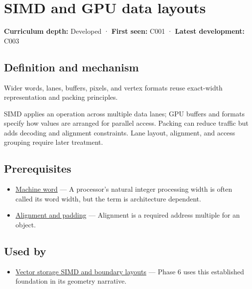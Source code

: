\hypertarget{appendix-3c7b1a56de01}{}\label{referencestart:appendix-3c7b1a56de01}
\section{SIMD and GPU data layouts}\label{appendix-3c7b1a56de01-simd-and-gpu-data-layouts}

\textbf{Curriculum depth:} Developed · \textbf{First seen:} C001 · \textbf{Latest development:} C003

\subsection{Definition and mechanism}\label{appendix-3c7b1a56de01-definition-and-mechanism}

Wider words, lanes, buffers, pixels, and vertex formats reuse exact-width representation and packing principles.

SIMD applies an operation across multiple data lanes; GPU buffers and formats specify how values are arranged for parallel access. Packing can reduce traffic but adds decoding and alignment constraints. Lane layout, alignment, and access grouping require later treatment.

\subsection{Prerequisites}\label{appendix-3c7b1a56de01-prerequisites}

\begin{itemize}
\tightlist
\item
  \hyperref[appendix-d67a19507dc5]{Machine word} --- A processor's natural integer processing width is often called its word width, but the term is architecture dependent.
\item
  \hyperref[appendix-a1f7c53b4742]{Alignment and padding} --- Alignment is a required address multiple for an object.
\end{itemize}

\subsection{Used by}\label{appendix-3c7b1a56de01-used-by}

\begin{itemize}
\tightlist
\item
  \hyperref[appendix-26bf6bf2fb8b]{Vector storage SIMD and boundary layouts} --- Phase 6 uses this established foundation in its geometry narrative.
\end{itemize}

